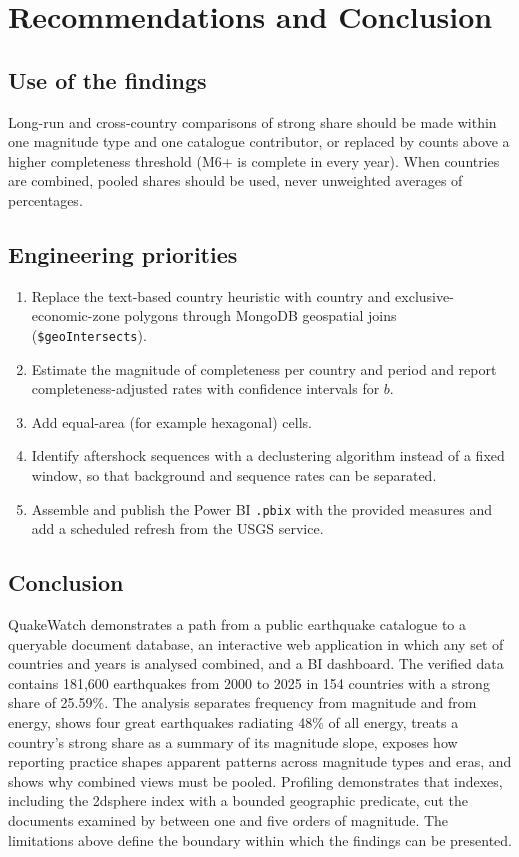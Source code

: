 \documentclass[11pt,a4paper]{article}
\begin{document}
\section{Recommendations and Conclusion}
\subsection{Use of the findings}
Long-run and cross-country comparisons of strong share should be made within one magnitude type and one catalogue contributor, or replaced by counts above a higher completeness threshold (M6+ is complete in every year). When countries are combined, pooled shares should be used, never unweighted averages of percentages.

\subsection{Engineering priorities}
\begin{enumerate}
\item Replace the text-based country heuristic with country and exclusive-economic-zone polygons through MongoDB geospatial joins (\texttt{\$geoIntersects}).
\item Estimate the magnitude of completeness per country and period and report completeness-adjusted rates with confidence intervals for $b$.
\item Add equal-area (for example hexagonal) cells.
\item Identify aftershock sequences with a declustering algorithm instead of a fixed window, so that background and sequence rates can be separated.
\item Assemble and publish the Power BI \texttt{.pbix} with the provided measures and add a scheduled refresh from the USGS service.
\end{enumerate}

\subsection{Conclusion}
QuakeWatch demonstrates a path from a public earthquake catalogue to a queryable document database, an interactive web application in which any set of countries and years is analysed combined, and a BI dashboard. The verified data contains 181,600 earthquakes from 2000 to 2025 in 154 countries with a strong share of 25.59\%. The analysis separates frequency from magnitude and from energy, shows four great earthquakes radiating 48\% of all energy, treats a country's strong share as a summary of its magnitude slope, exposes how reporting practice shapes apparent patterns across magnitude types and eras, and shows why combined views must be pooled. Profiling demonstrates that indexes, including the 2dsphere index with a bounded geographic predicate, cut the documents examined by between one and five orders of magnitude. The limitations above define the boundary within which the findings can be presented.
\end{document}
